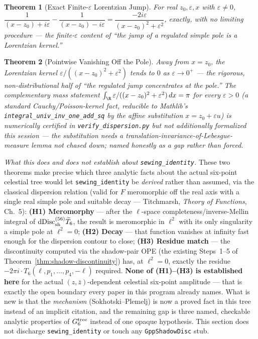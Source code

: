 \documentclass{report}
\newtheorem{theorem}{Theorem}[chapter]
\theoremstyle{definition}
\begin{document}
\begin{theorem}[Exact Finite-\texorpdfstring{$\varepsilon$}{eps} Lorentzian Jump]
  \label{thm:lorentzian-jump}
  \leanok
  For real $z_0,\varepsilon,x$ with $\varepsilon\neq0$,
  $\dfrac{1}{(x-z_0)+i\varepsilon} - \dfrac{1}{(x-z_0)-i\varepsilon}
    = \dfrac{-2i\varepsilon}{(x-z_0)^2+\varepsilon^2}$, exactly, with no limiting
  procedure --- the finite-$\varepsilon$ content of ``the jump of a regulated simple pole
  is a Lorentzian kernel.''
\end{theorem}

\begin{theorem}[Pointwise Vanishing Off the Pole]
  \label{thm:lorentzian-vanish}
  \leanok
  Away from $x=z_0$, the Lorentzian kernel $\varepsilon/((x-z_0)^2+\varepsilon^2)$ tends to
  $0$ as $\varepsilon\to0^+$ --- the rigorous, non-distributional half of ``the regulated
  jump concentrates at the pole.'' The complementary mass statement
  $\int_\R \varepsilon/((x-z_0)^2+\varepsilon^2)\,dx = \pi$ for every $\varepsilon>0$ (a
  standard Cauchy/Poisson-kernel fact, reducible to Mathlib's
  \texttt{integral\_univ\_inv\_one\_add\_sq} by the affine substitution
  $x=z_0+\varepsilon u$) is numerically certified in \texttt{verify\_dispersion.py} but
  \emph{not} additionally formalized this session --- the substitution needs a
  translation-invariance-of-Lebesgue-measure lemma not chased down; named honestly as a
  gap rather than forced.
\end{theorem}

\emph{What this does and does not establish about \texttt{sewing\_identity}.} These two
theorems make precise which three analytic facts about the actual six-point celestial
tree would let \texttt{sewing\_identity} be \emph{derived} rather than assumed, via the
classical dispersion relation (valid for $F$ meromorphic off the real axis with a single
real simple pole and suitable decay --- Titchmarsh, \emph{Theory of Functions}, Ch.~5):
\textbf{(H1) Meromorphy} --- after the $\ell$-space completeness/inverse-Mellin integral
of $\mathrm{dDisc}_{\rm sh}^{(56)}\widetilde T_6$, the result is meromorphic in $\ell^2$
with its only singularity a simple pole at $\ell^2=0$; \textbf{(H2) Decay} --- that
function vanishes at infinity fast enough for the dispersion contour to close;
\textbf{(H3) Residue match} --- the discontinuity computed via the shadow-pair OPE (the
existing Steps~1--5 of Theorem~\ref{thm:shadow-discontinuity}) has, at $\ell^2=0$, exactly
the residue $-2\pi i\cdot T_6(\ell,p_1,\dots,p_4,-\ell)$ required. \textbf{None of
(H1)--(H3) is established here} for the actual $(z,\bar z)$-dependent celestial six-point
amplitude --- that is exactly the open boundary every paper in this program already
names. What is new is that the \emph{mechanism} (Sokhotski--Plemelj) is now a proved fact
in this tree instead of an implicit citation, and the remaining gap is three named,
checkable analytic properties of $G_6^{\rm tree}$ instead of one opaque hypothesis. This
section does not discharge \texttt{sewing\_identity} or touch any \texttt{GppShadowDisc}
stub.
\end{document}
